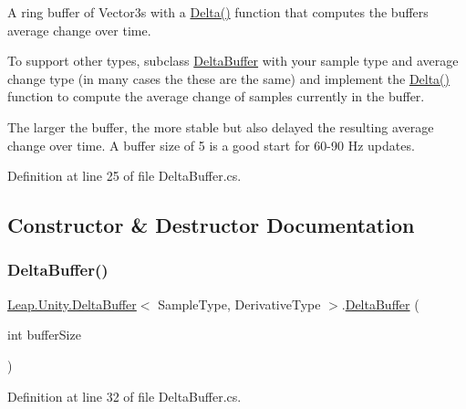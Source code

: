 A ring buffer of Vector3s with a \mbox{\hyperlink{class_leap_1_1_unity_1_1_delta_buffer_a8700bc7a1676ba39977f58debf74f5df}{Delta()}} function that computes the buffer\textquotesingle{}s average change over time.

To support other types, subclass \mbox{\hyperlink{class_leap_1_1_unity_1_1_delta_buffer}{Delta\+Buffer}} with your sample type and average change type (in many cases the these are the same) and implement the \mbox{\hyperlink{class_leap_1_1_unity_1_1_delta_buffer_a8700bc7a1676ba39977f58debf74f5df}{Delta()}} function to compute the average change of samples currently in the buffer. 

The larger the buffer, the more stable but also delayed the resulting average change over time. A buffer size of 5 is a good start for 60-\/90 Hz updates. 

Definition at line 25 of file Delta\+Buffer.\+cs.



\subsection{Constructor \& Destructor Documentation}
\mbox{\label{class_leap_1_1_unity_1_1_delta_buffer_a0aad81ffe455c866ec1d59eb7467f392}} 
\subsubsection{\texorpdfstring{DeltaBuffer()}{DeltaBuffer()}\hspace{0.1cm}{\footnotesize\ttfamily [1/2]}}
{\footnotesize\ttfamily \mbox{\hyperlink{class_leap_1_1_unity_1_1_delta_buffer}{Leap.\+Unity.\+Delta\+Buffer}}$<$ Sample\+Type, Derivative\+Type $>$.\mbox{\hyperlink{class_leap_1_1_unity_1_1_delta_buffer}{Delta\+Buffer}} (\begin{DoxyParamCaption}\item[{int}]{buffer\+Size }\end{DoxyParamCaption})}



Definition at line 32 of file Delta\+Buffer.\+cs.

\mbox{\label{class_leap_1_1_unity_1_1_delta_buffer_a0aad81ffe455c866ec1d59eb7467f392}} 
